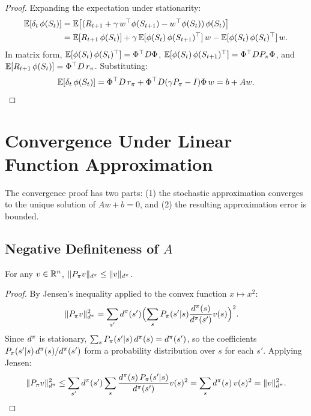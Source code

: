 \documentclass[11pt,a4paper]{article}
\begin{document}
\begin{proof}
Expanding the expectation under stationarity:
\begin{align}
  \mathbb{E}[\delta_t\,\phi(S_t)]
  &= \mathbb{E}\bigl[(R_{t+1} + \gamma\,w^\top\phi(S_{t+1})
     - w^\top\phi(S_t))\,\phi(S_t)\bigr] \nonumber\\
  &= \mathbb{E}[R_{t+1}\,\phi(S_t)]
     + \gamma\,\mathbb{E}[\phi(S_t)\,\phi(S_{t+1})^\top]\,w
     - \mathbb{E}[\phi(S_t)\,\phi(S_t)^\top]\,w.
  \label{eq:expand}
\end{align}
In matrix form, $\mathbb{E}[\phi(S_t)\,\phi(S_t)^\top] = \Phi^\top D \Phi$,
$\mathbb{E}[\phi(S_t)\,\phi(S_{t+1})^\top] = \Phi^\top D P_\pi \Phi$, and
$\mathbb{E}[R_{t+1}\,\phi(S_t)] = \Phi^\top D\, r_\pi$. Substituting:
\begin{equation}
  \mathbb{E}[\delta_t\,\phi(S_t)]
  = \Phi^\top D\, r_\pi
  + \Phi^\top D(\gamma P_\pi - I)\Phi\, w
  = b + Aw. \qedhere
\end{equation}
\end{proof}

\section{Convergence Under Linear Function Approximation}
\label{sec:convergence}

The convergence proof has two parts: (1) the stochastic approximation
converges to the unique solution of $Aw + b = 0$, and (2) the
resulting approximation error is bounded.

\subsection{Negative Definiteness of $A$}
\label{subsec:neg_def}

\begin{lemma}
\label{lem:contraction}
For any $v \in \mathbb{R}^n$,
$\|P_\pi v\|_{d^\pi} \leq \|v\|_{d^\pi}$.
\end{lemma}

\begin{proof}
By Jensen's inequality applied to the convex function $x \mapsto x^2$:
\begin{align}
  \|P_\pi v\|_{d^\pi}^2
  &= \sum_{s'} d^\pi(s')\Bigl(\sum_s P_\pi(s'|s)
     \frac{d^\pi(s)}{d^\pi(s')} v(s)\Bigr)^2.
  \label{eq:ppi_step1}
\end{align}
Since $d^\pi$ is stationary,
$\sum_s P_\pi(s'|s)\,d^\pi(s) = d^\pi(s')$, so the
coefficients $P_\pi(s'|s)\,d^\pi(s)/d^\pi(s')$ form a
probability distribution over $s$ for each $s'$. Applying Jensen:
\begin{equation}
  \|P_\pi v\|_{d^\pi}^2
  \leq \sum_{s'} d^\pi(s') \sum_s
  \frac{d^\pi(s)\,P_\pi(s'|s)}{d^\pi(s')} v(s)^2
  = \sum_s d^\pi(s)\,v(s)^2
  = \|v\|_{d^\pi}^2. \qedhere
\end{equation}
\end{proof}
\end{document}
